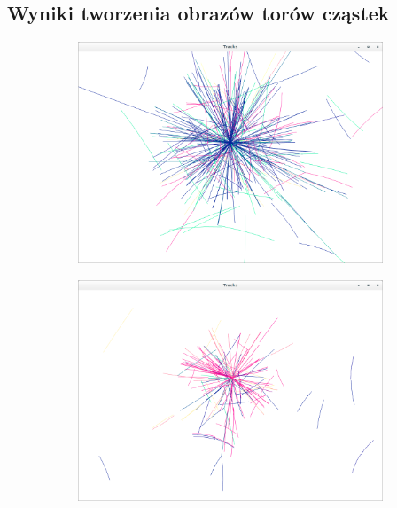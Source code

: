 \begin{appendices}
\section{Wyniki tworzenia obrazów torów cząstek}
\label{Tory}
\begin{figure}[H]
	\begin{subfigure}{0.50\textwidth}
		\centering
 		\includegraphics[width=\textwidth]{trackScreen1.png}
    	\caption{}
 		\label{rys18}
	\end{subfigure}
	\hfill
	\begin{subfigure}{0.50\textwidth}
		\centering
		\includegraphics[width=\textwidth]{trackScreen6.png}

\end{subfigure}
\end{figure}
\end{appendices}

